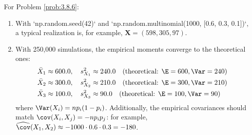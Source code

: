 \begin{solucion}
	\label{sol:3.8.6}
	For Problem \ref{prob:3.8.6}:
	\begin{enumerate}
		\item With `np.random.seed(42)` and `np.random.multinomial(1000, [0.6, 0.3, 0.1])`, a typical realization is, for example, $\bm{X} = (598, 305, 97)$.
		\item With 250{,}000 simulations, the empirical moments converge to the theoretical ones:
		\begin{align*}
			\bar{X}_{1} &\approx 600.0, \quad s_{X_{1}}^{2} \approx 240.0 \quad (\text{theoretical: } \E = 600, \Var = 240) \\
			\bar{X}_{2} &\approx 300.0, \quad s_{X_{2}}^{2} \approx 210.0 \quad (\text{theoretical: } \E = 300, \Var = 210) \\
			\bar{X}_{3} &\approx 100.0, \quad s_{X_{3}}^{2} \approx 90.0 \quad (\text{theoretical: } \E = 100, \Var = 90)
		\end{align*}
		where $\Var(X_{i}) = np_{i}(1-p_{i})$. Additionally, the empirical covariances should match $\cov(X_{i}, X_{j}) = -np_{i}p_{j}$: for example, $\widehat{\cov}(X_{1}, X_{2}) \approx -1000 \cdot 0.6 \cdot 0.3 = -180$.
	\end{enumerate}
\end{solucion}

